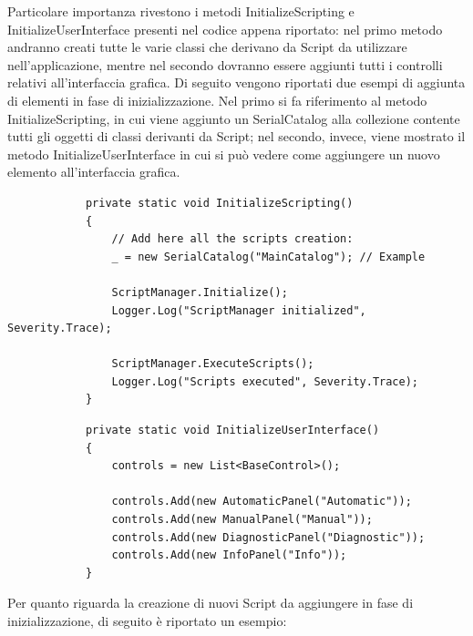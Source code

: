 \documentclass{article}
\begin{document}
		\newpage
	
		Particolare importanza rivestono i metodi InitializeScripting e InitializeUserInterface presenti nel codice appena riportato: nel primo metodo andranno creati tutte le varie classi che derivano da Script da utilizzare nell'applicazione, mentre nel secondo dovranno essere aggiunti tutti i controlli relativi all'interfaccia grafica.
		\newline
		Di seguito vengono riportati due esempi di aggiunta di elementi in fase di inizializzazione. Nel primo si fa riferimento al metodo InitializeScripting, in cui viene aggiunto un SerialCatalog alla collezione contente tutti gli oggetti di classi derivanti da Script; nel secondo, invece, viene mostrato il metodo InitializeUserInterface in cui si può vedere come aggiungere un nuovo elemento  all'interfaccia grafica.
		
		\begin{lstlisting}
			private static void InitializeScripting()
			{
				// Add here all the scripts creation:
				_ = new SerialCatalog("MainCatalog"); // Example
				
				ScriptManager.Initialize();
				Logger.Log("ScriptManager initialized", Severity.Trace);
				
				ScriptManager.ExecuteScripts();
				Logger.Log("Scripts executed", Severity.Trace);
			}
		\end{lstlisting}
	
		\begin{lstlisting}
			private static void InitializeUserInterface()
			{
				controls = new List<BaseControl>();
				
				controls.Add(new AutomaticPanel("Automatic"));
				controls.Add(new ManualPanel("Manual"));
				controls.Add(new DiagnosticPanel("Diagnostic"));
				controls.Add(new InfoPanel("Info"));
			}
		\end{lstlisting}
		
		\newpage
		
		Per quanto riguarda la creazione di nuovi Script da aggiungere in fase di inizializzazione, di seguito è riportato un esempio:
		
\end{document}
